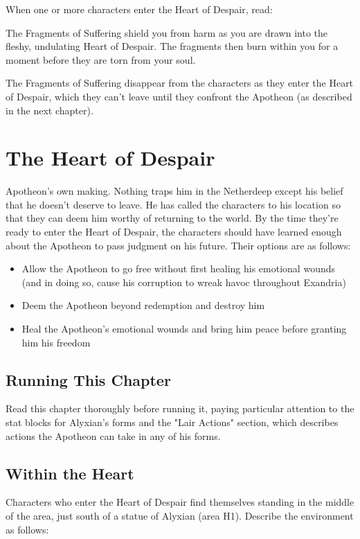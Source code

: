 \documentclass[10pt,a4paper,twoside,bg=print,twocolumn,openany,nodeprecatedcode]{dndbook}
\begin{document}
When one or more characters enter the Heart of Despair, read:

\begin{DndReadAloud}{}
The Fragments of Suffering shield you from harm as you are drawn into the fleshy, undulating Heart of Despair. The fragments then burn within you for a moment before they are torn from your soul.

\end{DndReadAloud}

The Fragments of Suffering disappear from the characters as they enter the Heart of Despair, which they can't leave until they confront the Apotheon (as described in the next chapter).

\chapter{The Heart of Despair}
 Apotheon's own making. Nothing traps him in the Netherdeep except his belief that he doesn't deserve to leave. He has called the characters to his location so that they can deem him worthy of returning to the world. By the time they're ready to enter the Heart of Despair, the characters should have learned enough about the Apotheon to pass judgment on his future. Their options are as follows:



\begin{itemize}
\item Allow the Apotheon to go free without first healing his emotional wounds (and in doing so, cause his corruption to wreak havoc throughout Exandria)
\item Deem the Apotheon beyond redemption and destroy him
\item Heal the Apotheon's emotional wounds and bring him peace before granting him his freedom
\end{itemize}

\section{Running This Chapter}
Read this chapter thoroughly before running it, paying particular attention to the stat blocks for Alyxian's forms and the "Lair Actions" section, which describes actions the Apotheon can take in any of his forms.

\section{Within the Heart}
Characters who enter the Heart of Despair find themselves standing in the middle of the area, just south of a statue of Alyxian (area H1). Describe the environment as follows:
\end{document}
